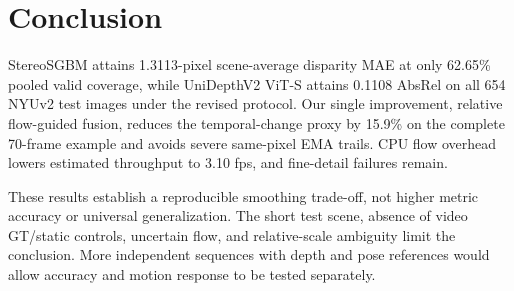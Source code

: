 \section{Conclusion}
StereoSGBM attains 1.3113-pixel scene-average disparity MAE at only 62.65\% pooled valid coverage, while UniDepthV2 ViT-S attains 0.1108 AbsRel on all 654 NYUv2 test images under the revised protocol. Our single improvement, relative flow-guided fusion, reduces the temporal-change proxy by 15.9\% on the complete 70-frame example and avoids severe same-pixel EMA trails. CPU flow overhead lowers estimated throughput to 3.10 fps, and fine-detail failures remain.

These results establish a reproducible smoothing trade-off, not higher metric accuracy or universal generalization. The short test scene, absence of video GT/static controls, uncertain flow, and relative-scale ambiguity limit the conclusion. More independent sequences with depth and pose references would allow accuracy and motion response to be tested separately.
